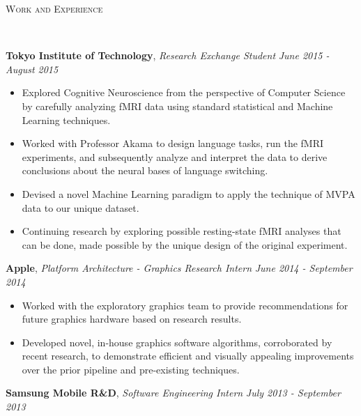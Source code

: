 \documentclass[9pt]{article}
\newenvironment{changemargin}[2]{%
  \begin{list}{}{%
    \setlength{\topsep}{0pt}%
    \setlength{\leftmargin}{#1}%
    \setlength{\rightmargin}{#2}%
    \setlength{\listparindent}{\parindent}%
    \setlength{\itemindent}{\parindent}%
    \setlength{\parsep}{\parskip}%
  }%
  \item[]}{\end{list}
}
\newcommand{\lineover}{
	\begin{changemargin}{-0.05in}{-0.05in}
		\vspace*{-8pt}
		\hrulefill \\
		\vspace*{-2pt}
	\end{changemargin}
}
\newcommand{\header}[1]{
	\begin{changemargin}{-0.5in}{-0.5in}
		\scshape{#1}\\
  	\lineover
	\end{changemargin}
}
\newenvironment{body} {
	\vspace*{-16pt}
	\begin{changemargin}{-0.25in}{-0.5in}
  }	
	{\end{changemargin}
}
\begin{document}
\header{Work and Experience}
\begin{body}
	\vspace{18pt}
	\textbf{Tokyo Institute of Technology}, \emph{Research Exchange Student} \hfill \emph{June 2015 - August 2015}\\
	\vspace*{-3pt}
	\begin{itemize} \itemsep -0pt %
	\item Explored Cognitive Neuroscience from the perspective of Computer Science by carefully analyzing fMRI data using standard statistical and Machine Learning techniques.
	\item Worked with Professor Akama to design language tasks, run the fMRI experiments, and subsequently analyze and interpret the data to derive conclusions about the neural bases of language switching.
	\item Devised a novel Machine Learning paradigm to apply the technique of MVPA data to our unique dataset.
	\item Continuing research by exploring possible resting-state fMRI analyses that can be done, made possible by the unique design of the original experiment.
	\end{itemize}
	\vspace*{1pt}
	\textbf{Apple}, \emph{Platform Architecture - Graphics Research Intern} \hfill \emph{June 2014 - September 2014}\\
	\vspace*{-3pt}
	\begin{itemize} \itemsep -0pt %
	\item Worked with the exploratory graphics team to provide recommendations for future graphics hardware based on research results.
	\item Developed novel, in-house graphics software algorithms, corroborated by recent research, to demonstrate efficient and visually appealing improvements over the prior pipeline and pre-existing techniques. 
	\end{itemize}
	\vspace*{1pt}
	\textbf{Samsung Mobile R\&D}, \emph{Software Engineering Intern} \hfill \emph{July 2013 - September 2013}\\
	\vspace*{-3pt}
	\begin{itemize} \itemsep -0pt %

\end{itemize}
\end{body}
\end{document}
